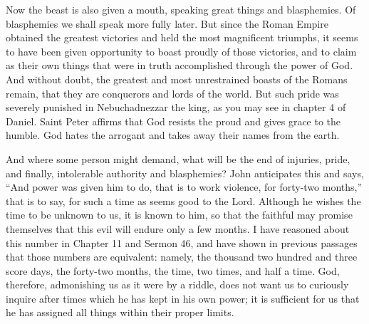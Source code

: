 Now the beast is also given a mouth, speaking great things and blasphemies. Of blasphemies we shall speak more fully later. But since the Roman Empire obtained the greatest victories and held the most magnificent triumphs, it seems to have been given opportunity to boast proudly of those victories, and to claim as their own things that were in truth accomplished through the power of God. And without doubt, the greatest and most unrestrained boasts of the Romans remain, that they are conquerors and lords of the world. But such pride was severely punished in Nebuchadnezzar the king, as you may see in chapter 4 of Daniel. Saint Peter affirms that God resists the proud and gives grace to the humble. God hates the arrogant and takes away their names from the earth.

And where some person might demand, what will be the end of injuries, pride, and finally, intolerable authority and blasphemies? John anticipates this and says, “And power was given him to do, that is to work violence, for forty-two months,” that is to say, for such a time as seems good to the Lord. Although he wishes the time to be unknown to us, it is known to him, so that the faithful may promise themselves that this evil will endure only a few months. I have reasoned about this number in Chapter 11 and Sermon 46, and have shown in previous passages that those numbers are equivalent: namely, the thousand two hundred and three score days, the forty-two months, the time, two times, and half a time. God, therefore, admonishing us as it were by a riddle, does not want us to curiously inquire after times which he has kept in his own power; it is sufficient for us that he has assigned all things within their proper limits.

